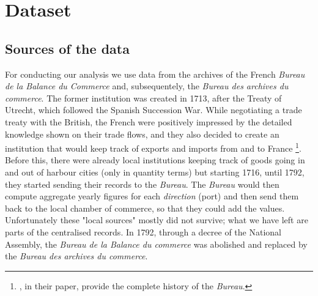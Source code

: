 \documentclass[12pt,a4paper,notitlepage,english]{article}
\begin{document}

\section{Dataset} \label{dataset}
\subsection{Sources of the data} \label{sources_of_data}
For conducting our analysis we use data from the archives of the French \textit{Bureau de la Balance du Commerce} and, subsequentely, the \textit{Bureau des archives du commerce}. The former institution was created in 1713, after the Treaty of Utrecht, which followed the Spanish Succession War. While negotiating a trade treaty with the British, the French were positively impressed by the detailed knowledge shown on their trade flows, and they also decided to create an institution that would keep track of exports and imports from and to France \citep{charles2011collecte}\footnote{\cite{charles2011collecte}, in their paper, provide the complete history of the \textit{Bureau}.}. Before this, there were already local institutions keeping track of goods going in and out of harbour cities (only in quantity terms) but starting 1716, until 1792, they started sending their records to the \textit{Bureau}. The \textit{Bureau} would then compute aggregate yearly figures for each \textit{direction} (port) and then send them back to the local chamber of commerce, so that they could add the values. Unfortunately these "local sources" mostly did not survive; what we have left are parts of the centralised records. In 1792, through a decree of the National Assembly, the \textit{Bureau de la Balance du commerce} was abolished and replaced by the \textit{Bureau des archives du commerce}.  \\
\end{document}
